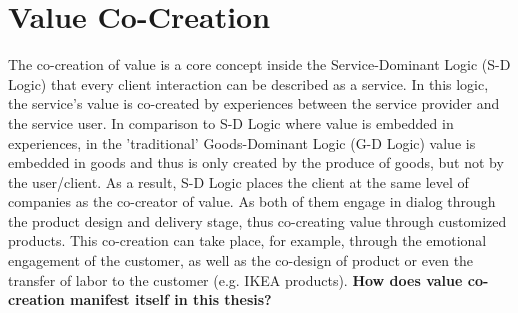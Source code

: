 \section{Value Co-Creation}
The co-creation of value is a core concept inside the Service-Dominant Logic (S-D Logic) that every client interaction can be described as a service. In this logic, the service's value is co-created by experiences between the service provider and the service user.\cite{Payne:2008:ValueCo-Creation}
\newline\newline
In comparison to S-D Logic where value is embedded in experiences, in the 'traditional' Goods-Dominant Logic (G-D Logic) value is embedded in goods and thus is only created by the produce of goods, but not by the user/client. \cite{Payne:2008:ValueCo-Creation}
\newline\newline
As a result, S-D Logic places the client at the same level of companies as the co-creator of value. As both of them engage in dialog through the product design and delivery stage, thus co-creating value through customized products. This co-creation can take place, for example, through the emotional engagement of the customer, as well as the co-design of product or even the transfer of labor to the customer (e.g. IKEA products). \cite{Payne:2008:ValueCo-Creation}
\newline\newline
\textbf{How does value co-creation manifest itself in this thesis?}